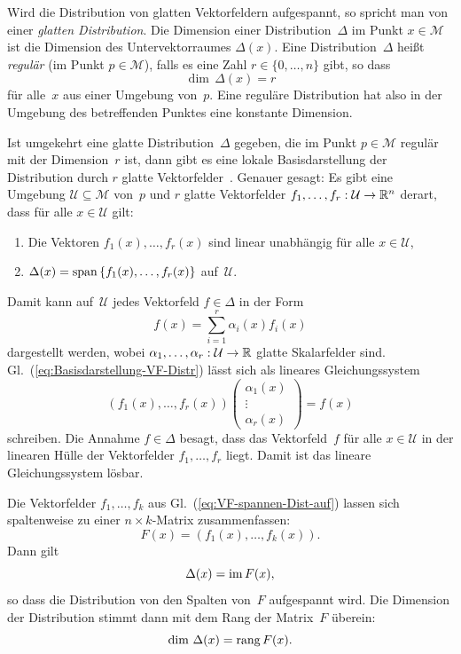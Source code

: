 Wird die Distribution von glatten Vektorfeldern aufgespannt, so spricht
man von einer \emph{glatten Distribution}. Die Dimension einer Distribution~$\Delta$
im Punkt $x\in\mathcal{M}$ ist die Dimension des Unter\-vektor\-raumes
$\Delta(x)$. Eine Distribution~$\Delta$ heißt \emph{regulär}
(im Punkt $p\in\mathcal{M}$), falls es eine Zahl $r\in\{0,\ldots,n\}$
gibt, so dass 
\[
\dim\,\Delta(x)=r
\]
 für alle~$x$ aus einer Umgebung von~$p$. Eine reguläre Distribution
hat also in der Umgebung des betreffenden Punktes eine konstante Dimension. 

Ist umgekehrt eine glatte Distribution~$\Delta$ gegeben, die im
Punkt $p\in\mathcal{M}$ regulär mit der Dimension~$r$ ist, dann
gibt es eine lokale Basisdarstellung der Distribution durch $r$ glatte
Vektorfelder~\cite[Lemma~{19.1}]{lee2006}. Genauer gesagt: Es gibt
eine Umgebung $\mathcal{U}\subseteq\mathcal{M}$ von~$p$ und $r$
glatte Vektorfelder $f_{1},\ldots,f_{r}:\mathcal{U}\to{\mathbb{R}}^{n}$ derart,
dass für alle $x\in\mathcal{U}$ gilt:
\begin{enumerate}
\item Die Vektoren $f_{1}(x),\ldots,f_{r}(x)$ sind linear unabhängig für
alle $x\in\mathcal{U}$,
\item $\Delta(x)={\operatorname{span}}\left\{ f_{1}(x),\ldots,f_{r}(x)\right\} $ auf~$\mathcal{U}$.
\end{enumerate}
Damit kann auf~$\mathcal{U}$ jedes Vektorfeld $f\in\Delta$ in der
Form
\begin{equation}
f(x)=\sum_{i=1}^{r}\alpha_{i}(x)f_{i}(x)\label{eq:Basisdarstellung-VF-Distr}
\end{equation}
dargestellt werden, wobei $\alpha_{1},\ldots,\alpha_{r}:\mathcal{U}\to{\mathbb{R}}$
glatte Skalarfelder sind. Gl.~(\ref{eq:Basisdarstellung-VF-Distr})
lässt sich als lineares Gleichungssystem 
\[
\left(f_{1}(x),\ldots,f_{r}(x)\right)\left(\begin{array}{c}
\alpha_{1}(x)\\
\vdots\\
\alpha_{r}(x)
\end{array}\right)=f(x)
\]
schreiben. Die Annahme $f\in\Delta$ besagt, dass das Vektorfeld~$f$
für alle $x\in\mathcal{U}$ in der linearen Hülle der Vektorfelder
$f_{1},\ldots,f_{r}$ liegt. Damit ist das lineare Gleichungssystem
lösbar.

Die Vektorfelder $f_{1},\ldots,f_{k}$ aus Gl.~(\ref{eq:VF-spannen-Dist-auf})
lassen sich spaltenweise zu einer $n\times k$-Matrix zusammenfassen:
\[
F(x)=\left(f_{1}(x),\ldots,f_{k}(x)\right).
\]
Dann gilt 
\[
\Delta(x)={\operatorname{im}}\,F(x),
\]
so dass die Distribution von den Spalten von~$F$ aufgespannt wird.
Die Dimension der Distribution stimmt dann mit dem Rang der Matrix~$F$
überein: 
\[
\dim\,\Delta(x)={\operatorname{rang}}\,F(x).
\]

